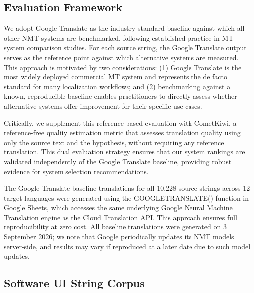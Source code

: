 \documentclass[Afour,sagev,times,doublespace]{sagej}
\begin{document}
\subsection{Evaluation Framework}

We adopt Google Translate as the industry-standard baseline against which all other NMT systems are benchmarked, following established practice in MT system comparison studies. For each source string, the Google Translate output serves as the reference point against which alternative systems are measured. This approach is motivated by two considerations: (1) Google Translate is the most widely deployed commercial MT system and represents the de facto standard for many localization workflows; and (2) benchmarking against a known, reproducible baseline enables practitioners to directly assess whether alternative systems offer improvement for their specific use cases.

Critically, we supplement this reference-based evaluation with CometKiwi,\cite{27} a reference-free quality estimation metric that assesses translation quality using only the source text and the hypothesis, without requiring any reference translation. This dual evaluation strategy ensures that our system rankings are validated independently of the Google Translate baseline, providing robust evidence for system selection recommendations.

The Google Translate baseline translations for all 10,228 source strings across 12 target languages were generated using the GOOGLETRANSLATE() function in Google Sheets, which accesses the same underlying Google Neural Machine Translation engine as the Cloud Translation API. This approach ensures full reproducibility at zero cost. All baseline translations were generated on 3 September 2026; we note that Google periodically updates its NMT models server-side, and results may vary if reproduced at a later date due to such model updates.

\subsection{Software UI String Corpus}
\end{document}
